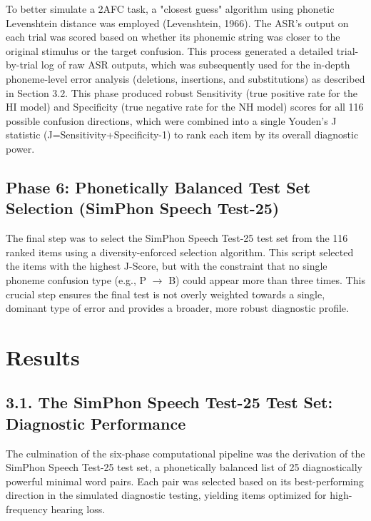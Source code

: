 \documentclass{article}
\begin{document}
To better simulate a 2AFC task, a "closest guess" algorithm using phonetic Levenshtein distance was employed (Levenshtein, 1966). The ASR's output on each trial was scored based on whether its phonemic string was closer to the original stimulus or the target confusion. This process generated a detailed trial-by-trial log of raw ASR outputs, which was subsequently used for the in-depth phoneme-level error analysis (deletions, insertions, and substitutions) as described in Section 3.2. This phase produced robust Sensitivity (true positive rate for the HI model) and Specificity (true negative rate for the NH model) scores for all 116 possible confusion directions, which were combined into a single Youden's J statistic (J=Sensitivity+Specificity-1) to rank each item by its overall diagnostic power.

\subsection{Phase 6: Phonetically Balanced Test Set Selection (SimPhon Speech Test-25)}
The final step was to select the SimPhon Speech Test-25 test set from the 116 ranked items using a diversity-enforced selection algorithm. This script selected the items with the highest J-Score, but with the constraint that no single phoneme confusion type (e.g., P $\rightarrow$ B) could appear more than three times. This crucial step ensures the final test is not overly weighted towards a single, dominant type of error and provides a broader, more robust diagnostic profile.

\section{Results}

\subsection{3.1. The SimPhon Speech Test-25 Test Set: Diagnostic Performance}
The culmination of the six-phase computational pipeline was the derivation of the SimPhon Speech Test-25 test set, a phonetically balanced list of 25 diagnostically powerful minimal word pairs. Each pair was selected based on its best-performing direction in the simulated diagnostic testing, yielding items optimized for high-frequency hearing loss.
\end{document}
